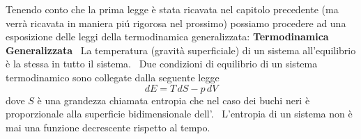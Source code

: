 \par
Tenendo conto che la prima legge \`e stata ricavata nel capitolo precedente (ma verr\`a ricavata in maniera pi\'u rigorosa nel prossimo) possiamo procedere ad una esposizione delle leggi della termodinamica generalizzata:
\bigskip
{\bf Termodinamica Generalizzata}
\ La temperatura (gravit\`a superficiale) di un sistema all'equilibrio \`e la stessa in tutto il sistema.
\ Due condizioni di equilibrio di un sistema termodinamico sono collegate dalla seguente legge
$$
dE=T\,dS-p\,dV
$$
dove $S$ \`e una grandezza chiamata entropia che nel caso dei buchi neri \`e pro\-por\-zio\-na\-le alla superficie bidimensionale dell'\Oe.
\ L'entropia di un sistema non \`e mai una funzione decrescente rispetto al tempo.
